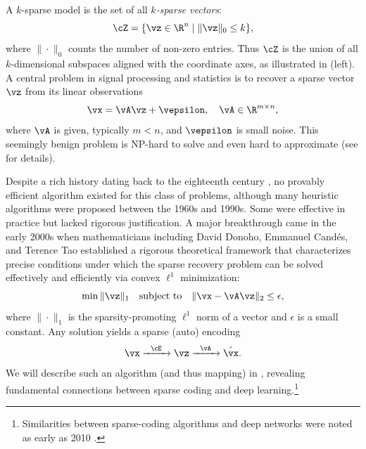 \documentclass[../../book-main.tex]{subfiles}
\begin{document}
A \(k\)-sparse model is the set of all \textit{\(k\)-sparse vectors}:
\begin{equation}
    \cZ = \{\vz \in \R^{n} \mid \|\vz\|_{0} \leq k\},
\end{equation}
where \(\|\cdot\|_{0}\) counts the number of non-zero entries. Thus
\(\cZ\) is the union of all \(k\)-dimensional subspaces aligned with
the coordinate axes, as illustrated in 
(left). A central problem in signal processing and statistics is to
recover a sparse vector \(\vz\) from its linear observations
\begin{equation}
    \vx = \vA \vz + \vepsilon, \quad \vA \in \R^{m\times n},
    \label{eqn:sparse-model}
\end{equation}
where \(\vA\) is given, typically \(m < n\), and \(\vepsilon\) is
small noise. This seemingly benign problem is NP-hard to solve and
even hard to approximate (see \cite{Wright-Ma-2022} for details).

Despite a rich history dating back to the eighteenth century
\cite{Boscovichca1750}, no provably efficient algorithm existed for
this class of problems, although many heuristic algorithms were
proposed between the 1960s and 1990s. Some were effective in practice
but lacked rigorous justification. A major breakthrough came in the
early 2000s when mathematicians including David Donoho, Emmanuel
Cand\'{e}s, and Terence Tao
\cite{donoho2005neighborly,Candes2005,CandesE2005-IT} established a
rigorous theoretical framework that characterizes precise conditions
under which the sparse recovery problem can be solved effectively and
efficiently via convex \(\ell^{1}\) minimization:
\begin{equation}
    \min \|\vz\|_{1} \quad \text{subject to} \quad \|\vx -
    \vA\vz\|_{2} \leq \epsilon,
\end{equation}
where \(\|\cdot\|_{1}\) is the sparsity-promoting \(\ell^{1}\) norm
of a vector and \(\epsilon\) is a small constant. Any solution yields
a sparse (auto) encoding
\begin{equation}
    \vx \xrightarrow{\hspace{2mm} \cE \hspace{2mm}} \vz
    \xrightarrow{\hspace{2mm} \vA \hspace{2mm}} \hat{\vx}.
    \label{eqn:decoding-sparse}
\end{equation}
We will describe such an algorithm (and thus mapping) in
, revealing fundamental connections between sparse
coding and deep learning.\footnote{Similarities between sparse-coding
    algorithms and deep networks were noted as early as 2010
\cite{gregor2010learning}.}
\end{document}
